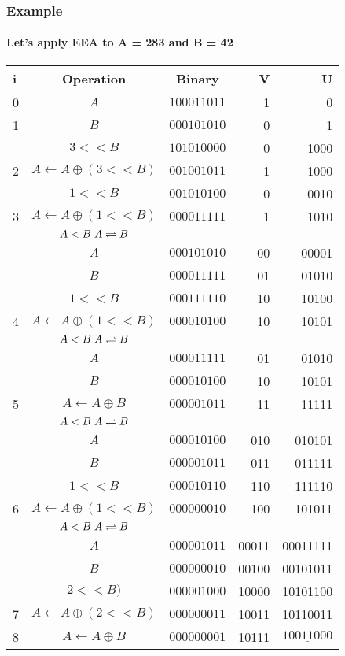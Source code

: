 \documentclass[12pt]{beamer}
\begin{document}
\begin{frame}
	\frametitle{Example}
	\framesubtitle{Let's apply EEA to A = 283 and B = 42}
	\tiny 
	\begin{center}
		\begin{tabular}{| l | c | c | r | r |}
			\hline
			i & Operation & Binary & V & U \\ \hline
			0 & $A$ & $100011011$ & 1 & 0 \\ \hline 
			1 & $B$ & $000101010$ & 0 & 1 \\ \hline
			  & $3<<B$ & $101010000$ & 0 & 1000 \\ 
			2 & $A \leftarrow A \oplus (3<<B)$ & $001001011$ & 1 & 1000 \\ \hline
			 & $1<<B$ & $001010100$ & 0 & 0010 \\
			3 & $A \leftarrow A \oplus (1<<B)$ & $000011111$ & 1 & 1010 \\ \hline
			 & $A<B \hspace{1mm} A \rightleftharpoons B$ & & & \\
			 & $A$ & $000101010$ & 00 & 00001 \\
			 & $B$ & $000011111$ & 01 & 01010 \\
			 & $1<<B$ & $000111110$ & 10 & 10100 \\
			4 & $A \leftarrow A \oplus (1<<B)$ & $000010100$ & 10 & 10101 \\ \hline
			 & $A<B \hspace{1mm} A \rightleftharpoons B$ & & & \\
			 & $A$ & $000011111$ & 01 & 01010 \\
			 & $B$ & $000010100$ & 10 & 10101 \\
			5 & $A \leftarrow A \oplus B$ & $000001011$ & 11 & 11111 \\ \hline
			 & $A<B \hspace{1mm} A \rightleftharpoons B$ & & & \\
			 & $A$ & $000010100$ & 010 & 010101 \\
			 & $B$ & $000001011$ & 011 & 011111 \\
			 & $1<<B$ & $000010110$ & 110 & 111110 \\
			6 & $A \leftarrow A \oplus (1<<B)$ & $000000010$ & 100 &  101011 \\ \hline	
			 & $A<B \hspace{1mm} A \rightleftharpoons B$ & & & \\
			 & $A$ & $000001011$ & 00011 & 00011111 \\
			 & $B$ & $000000010$ & 00100 & 00101011 \\
			 & $2<<B)$ & $000001000$ & 10000 & 10101100 \\
			7 & $A \leftarrow A \oplus (2<<B)$ & $000000011$ & 10011 & 10110011 \\ \hline
			8 & $A \leftarrow A \oplus B$ & $000000001$ & 10111 & $\underline{10011000}$ \\ \hline		 
		\end{tabular}
	\end{center}
\end{frame}
\end{document}
